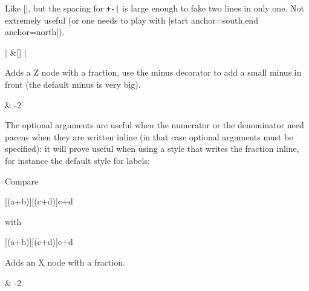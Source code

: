 \documentclass[a4paper]{ltxdoc}
\begin{document}
{\begin{command}{\zxNoneDouble\opt{+-}}
  Like |\zxNone|, but the spacing for \verb#+-|# is large enough to fake two lines in only one. Not extremely useful (or one needs to play with |start anchor=south,end anchor=north|).
\begin{codeexample}[width=3cm]
\begin{ZX}
  \zxNoneDouble|{} \ar[r,s,start anchor=north,end anchor=south] \ar[r,s,start anchor=south,end anchor=north] &[\zxWCol] \zxNoneDouble|{}
\end{ZX}
\end{codeexample}
\end{command}

\begin{command}{\zxFracZ\opt{-}}
  Adds a Z node with a fraction, use the minus decorator to add a small minus in front (the default minus is very big).
\begin{codeexample}[width=3cm]
\begin{ZX}
   & \zxFracZ-{\pi}{2}
\end{ZX}
\end{codeexample}
The optional arguments are useful when the numerator or the denominator need parens when they are written inline (in that case optional arguments must be specified): it will prove useful when using a style that writes the fraction inline, for instance the default style for labels:
\begin{codeexample}[]
Compare
\begin{ZX}
  [(a+b)][(c+d)]{c+d}
\end{ZX} with %
\begin{ZX}
  [(a+b)][(c+d)]{c+d}
\end{ZX}
\end{codeexample}
\end{command}

\begin{command}{\zxFracX\opt{-}}
  Adds an X node with a fraction.
\begin{codeexample}[width=3cm]
\begin{ZX}
   & \zxFracX-{\pi}{2}
\end{ZX}
\end{codeexample}
\end{command}

}
\end{document}
